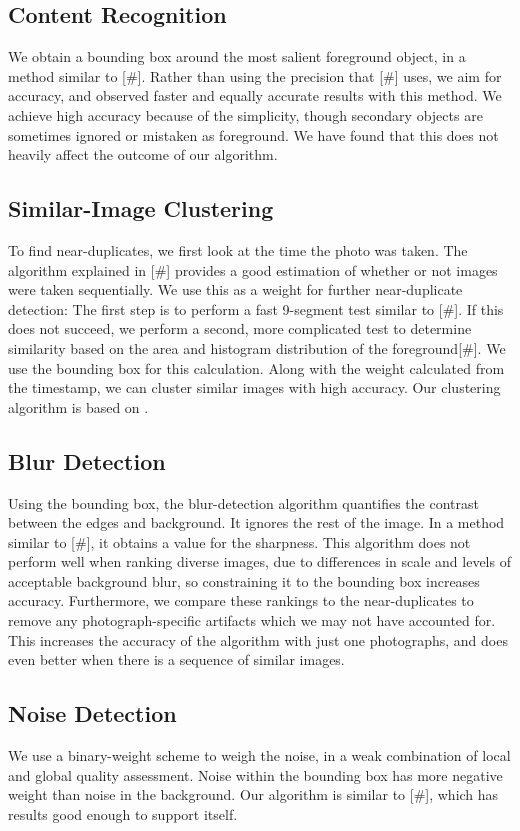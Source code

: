\documentclass[twocolumn]{article}
\begin{document}
\subsection{Content Recognition}
We obtain a bounding box around the most salient foreground object, in a method similar to [\#]. Rather than using the precision that [\#] uses, we aim for accuracy, and observed faster and equally accurate results with this method. We achieve high accuracy because of the simplicity, though secondary objects are sometimes ignored or mistaken as foreground. We have found that this does not heavily affect the outcome of our algorithm.
\subsection{Similar-Image Clustering}
To find near-duplicates, we first look at the time the photo was taken. The algorithm explained in [\#] provides a good estimation of whether or not images were taken sequentially. We use this as a weight for further near-duplicate detection:
The first step is to perform a fast 9-segment test similar to [\#]. If this does not succeed, we perform a second, more complicated test to determine similarity based on the area and histogram distribution of the foreground[\#]. We use the bounding box for this calculation.
Along with the weight calculated from the timestamp, we can cluster similar images with high accuracy. Our clustering algorithm is based on \cite{eads-hcluster-software}.
         
\subsection{Blur Detection}
Using the bounding box, the blur-detection algorithm quantifies the contrast between the edges and background. It ignores the rest of the image. In a method similar to [\#], it obtains a value for the sharpness. This algorithm does not perform well when ranking diverse images, due to differences in scale and levels of acceptable background blur, so constraining it to the bounding box increases accuracy. Furthermore, we compare these rankings to the near-duplicates to remove any photograph-specific artifacts which we may not have accounted for. This increases the accuracy of the algorithm with just one photographs, and does even better when there is a sequence of similar images.
\subsection{Noise Detection}
We use a binary-weight scheme to weigh the noise, in a weak combination of local and global quality assessment. Noise within the bounding box has more negative weight than noise in the background. Our algorithm is similar to [\#], which has results good enough to support itself.
\end{document}
